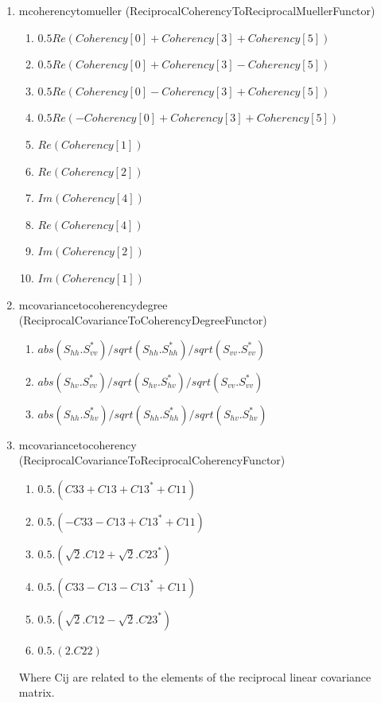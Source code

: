 \begin{enumerate}
\item mcoherencytomueller (ReciprocalCoherencyToReciprocalMuellerFunctor)
\begin{enumerate}
\item $ 0.5 Re( Coherency[0]+Coherency[3]+Coherency[5]) $ 
\item $ 0.5 Re( Coherency[0]+Coherency[3]-Coherency[5]) $ 
\item $ 0.5 Re( Coherency[0]-Coherency[3]+Coherency[5]) $ 
\item $ 0.5 Re(-Coherency[0]+Coherency[3]+Coherency[5]) $ 
\item $ Re(Coherency[1]) $ 
\item $ Re(Coherency[2]) $ 
\item $ Im(Coherency[4]) $ 
\item $ Re(Coherency[4]) $ 
\item $ Im(Coherency[2]) $ 
\item $ Im(Coherency[1]) $
\end{enumerate}
 
\item mcovariancetocoherencydegree (ReciprocalCovarianceToCoherencyDegreeFunctor)
\begin{enumerate}
\item $ abs(S_{hh}.S_{vv}^{*}) / sqrt(S_{hh}.S_{hh}^{*}) / sqrt(S_{vv}.S_{vv}^{*}) $ 
\item $ abs(S_{hv}.S_{vv}^{*}) / sqrt(S_{hv}.S_{hv}^{*}) / sqrt(S_{vv}.S_{vv}^{*}) $ 
\item $ abs(S_{hh}.S_{hv}^{*}) / sqrt(S_{hh}.S_{hh}^{*}) / sqrt(S_{hv}.S_{hv}^{*}) $
\end{enumerate}
 
\item mcovariancetocoherency (ReciprocalCovarianceToReciprocalCoherencyFunctor)
\begin{enumerate}
\item $ 0.5 . ( C33 + C13 + C13^{*} + C11 ) $ 
\item $ 0.5 . ( -C33 - C13 + C13^{*} + C11 ) $ 
\item $ 0.5 . ( \sqrt{2}.C12 + \sqrt{2}.C23^{*} ) $ 
\item $ 0.5 . ( C33 - C13 - C13^{*} + C11 ) $ 
\item $ 0.5 . ( \sqrt{2}.C12 - \sqrt{2}.C23^{*} ) $ 
\item $ 0.5 . ( 2 . C22 ) $
\end{enumerate}

Where Cij are related to the elements of the reciprocal linear covariance matrix.
 

\end{enumerate}

